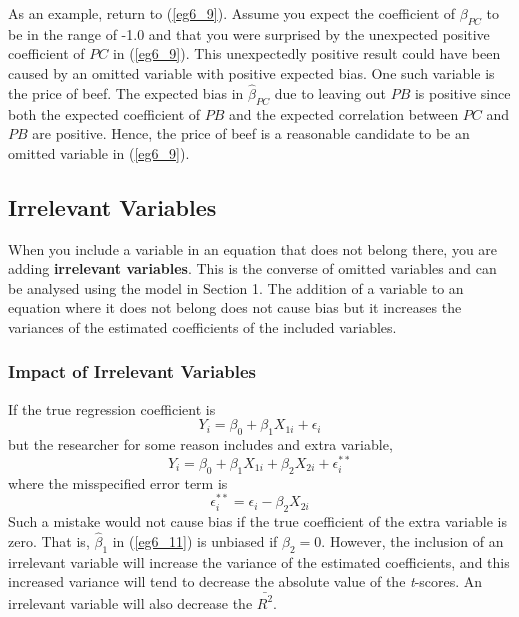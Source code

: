 \documentclass[11pt]{article}
\begin{document}
As an example, return to (\ref{eg6_9}). Assume you expect the coefficient of $\beta_{PC}$ to be in the range of -1.0 and that you were surprised by the unexpected positive coefficient of $PC$ in (\ref{eg6_9}).  This unexpectedly positive result could have been caused by an omitted variable with positive expected bias. One such variable is the price of beef. The expected bias in $\hat{\beta}_{PC}$ due to leaving out $PB$ is positive since both the expected coefficient of $PB$ and the expected correlation between $PC$ and $PB$ are positive. Hence, the price of beef is a reasonable candidate to be an omitted variable in (\ref{eg6_9}).
\subsection{Irrelevant Variables}
When you include a variable in an equation that does not belong there, you are adding \textbf{irrelevant variables}. This is the converse of omitted variables and can be analysed using the model in Section 1. The addition of a variable to an equation where it does not belong does not cause bias but it increases the variances of the estimated coefficients of the included variables. 
\subsubsection{Impact of Irrelevant Variables}
If the true regression coefficient is
\begin{equation}
Y_i = \beta_0 + \beta_1X_{1i} + \epsilon_i \label{eg6_10}
\end{equation}
but the researcher for some reason includes and extra variable,
\begin{equation}
Y_i = \beta_0 + \beta_1X_{1i} + \beta_{2}X_{2i} + \epsilon_i^{**} \label{eg6_11}
\end{equation}
where the misspecified error term is
\begin{equation}
\label{eg6_12} \epsilon_i^{**} = \epsilon_i - \beta_{2}X_{2i}
\end{equation}
Such a mistake would not cause bias if the true coefficient of the extra variable is zero. That is, $\hat{\beta}_1$ in (\ref{eg6_11}) is unbiased if $\beta_{2} = 0$. However, the inclusion of an irrelevant variable will increase the variance of the estimated coefficients, and this increased variance will tend to decrease the absolute value of the \textit{t}-scores. An irrelevant variable will also decrease the $\bar{R^2}$.
\end{document}
